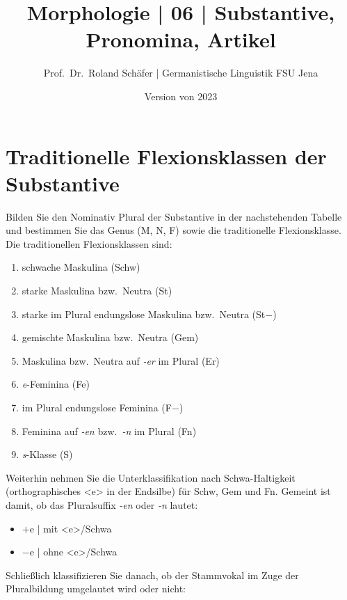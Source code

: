 \documentclass[12pt,a4paper,twoside]{article}
\author{Prof.\ Dr.\ Roland Schäfer | Germanistische Linguistik FSU Jena}
\title{Morphologie | 06 | Substantive, Pronomina, Artikel}
\date{Version von 2023}
\newcommand{\Lf}{
  \setlength{\itemsep}{1pt}
  \setlength{\parskip}{0pt}
  \setlength{\parsep}{0pt}
}
\begin{document}
\maketitle

\section{Traditionelle Flexionsklassen der Substantive}

Bilden Sie den Nominativ Plural der Substantive in der nachstehenden Tabelle und bestimmen Sie das Genus (M, N, F) sowie die traditionelle Flexionsklasse.
Die traditionellen Flexionsklassen sind:

\begin{enumerate}\Lf
  \item schwache Maskulina (Schw) %
  \item starke Maskulina bzw.\ Neutra (St) %
  \item starke im Plural endungslose Maskulina bzw.\ Neutra (St$-$) %
  \item gemischte Maskulina bzw.\ Neutra (Gem) %
  \item Maskulina bzw.\ Neutra auf \textit{-er} im Plural (Er)\footnotemark[1] %
  \item \textit{e}-Feminina (Fe)\footnotemark[1] %
  \item im Plural endungslose Feminina (F$-$)\footnotemark[1] %
  \item Feminina auf \textit{-en} bzw.\ \textit{-n} im Plural (Fn)\footnotemark[2] %
  \item \textit{s}-Klasse (S) %
\end{enumerate}


Weiterhin nehmen Sie die Unterklassifikation nach Schwa-Haltigkeit (orthographisches <e> in der Endsilbe) für Schw, Gem und Fn. Gemeint ist damit, ob das Pluralsuffix \textit{-en} oder \textit{-n} lautet:

\begin{itemize}\Lf
  \item $+$e | mit <e>\slash Schwa
  \item $-$e | ohne <e>\slash Schwa
\end{itemize}

Schließlich klassifizieren Sie danach, ob der Stammvokal im Zuge der Pluralbildung umgelautet wird oder nicht:
\end{document}
